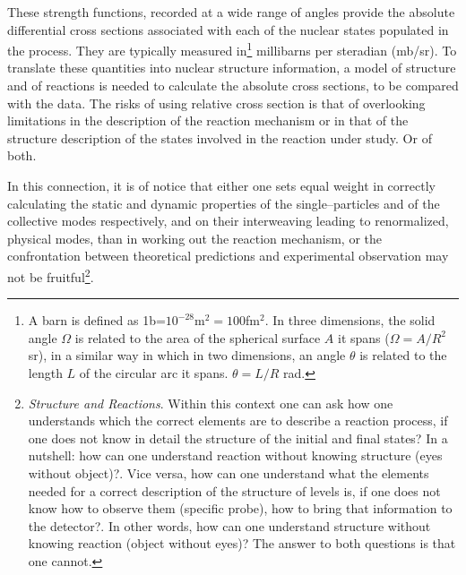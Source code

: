 These strength functions, recorded at a wide range of angles provide the absolute differential cross sections associated with each of the nuclear states populated in the process. They are  typically measured in\footnote{A barn is defined as 1b=$10^{-28}$m$^2=100$fm$^2$. In three dimensions, the solid angle $\Omega$ is related to the area of the spherical surface $A$ it spans ($\Omega=A/R^2$ sr), in a similar way in which in two dimensions, an angle $\theta$ is related to the length $L$ of the circular arc it spans. $\theta=L/R$ rad.} millibarns per  steradian (mb/sr). To translate these quantities into nuclear structure information, a model of structure and of reactions is needed to calculate the absolute cross sections, to be compared with the data. The risks of using relative cross section is that of overlooking limitations in the description of the reaction mechanism or in that of the structure description of the states involved in the reaction under study. Or of both.

In this connection, it is of notice that either one sets equal weight in correctly calculating the static and dynamic   properties  of the single--particles and of the collective modes respectively, and on their interweaving leading to renormalized, physical modes, than in working out the reaction mechanism, or the confrontation between theoretical predictions and experimental observation may not be fruitful\footnote{\textit{Structure and Reactions}. Within this context one can ask how one understands which the correct elements are to describe a reaction process, if one does not know in detail the structure of the initial and final states? In a nutshell: how can one understand reaction without knowing structure (eyes without object)?. 
Vice versa, how can one understand what the elements needed for a correct description of the structure of levels is, if one does not know how to observe them (specific probe), how to bring that information to the detector?. In other words, how can one understand structure without knowing reaction (object without eyes)? The answer to both questions is that one cannot.}.

